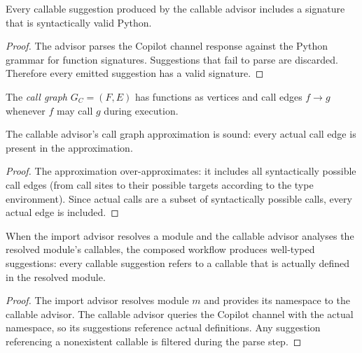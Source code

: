 \documentclass[11pt]{article}
\begin{document}
\begin{lemma}
\label{lem:callable-typecheck}
Every callable suggestion produced by the callable advisor
includes a signature that is syntactically valid Python.
\end{lemma}

\begin{proof}
The advisor parses the Copilot channel response against the
Python grammar for function signatures.  Suggestions that fail
to parse are discarded.  Therefore every emitted suggestion has
a valid signature.
\end{proof}

\begin{definition}
\label{def:call-graph}
The \emph{call graph} $G_C = (F, E)$ has functions as vertices
and call edges $f \to g$ whenever $f$ may call $g$ during
execution.
\end{definition}

\begin{lemma}
\label{lem:cg-sound}
The callable advisor's call graph approximation is sound:
every actual call edge is present in the approximation.
\end{lemma}

\begin{proof}
The approximation over-approximates: it includes all syntactically
possible call edges (from call sites to their possible targets
according to the type environment).  Since actual calls are a
subset of syntactically possible calls, every actual edge is
included.
\end{proof}

\begin{lemma}
\label{lem:import-callable-typed}
When the import advisor resolves a module and the callable advisor
analyses the resolved module's callables, the composed workflow
produces well-typed suggestions: every callable suggestion refers
to a callable that is actually defined in the resolved module.
\end{lemma}

\begin{proof}
The import advisor resolves module $m$ and provides its namespace
to the callable advisor.  The callable advisor queries the Copilot
channel with the actual namespace, so its suggestions reference
actual definitions.  Any suggestion referencing a nonexistent
callable is filtered during the parse step.
\end{proof}
\end{document}
